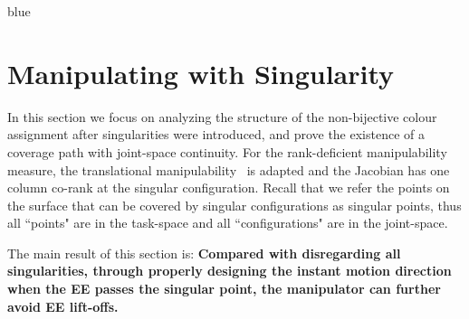 \documentclass[Afour,sageh,times]{sagej}
\begin{document}
\begin{color}{blue}
\section{Manipulating with Singularity}\label{section_analytic}
\end{color}
In this section we focus on analyzing the structure of the non-bijective colour assignment after singularities were introduced, and prove the existence of a coverage path with joint-space continuity. 
For the rank-deficient manipulability measure, the translational manipulability~\cite{yoshikawa1990translational} is adapted and the Jacobian has one column co-rank at the singular configuration. 
Recall that we refer the points on the surface that can be covered by singular configurations as singular points, thus all ``points" are in the task-space and all ``configurations" are in the joint-space. 

The main result of this section is: \textbf{Compared with disregarding all singularities, through properly designing the instant motion direction when the EE passes the singular point, the manipulator can further avoid EE lift-offs. }
\end{document}
